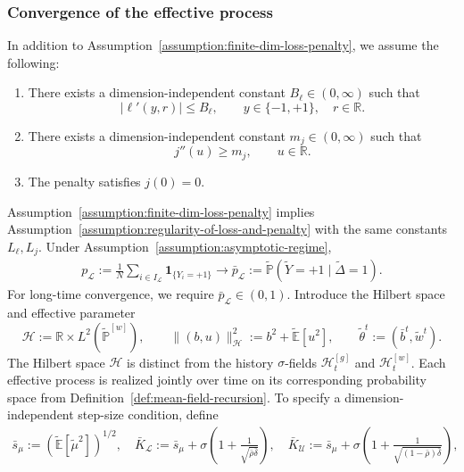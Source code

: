 \subsubsection{Convergence of the effective process}

\begin{assumption}
\label{assumption:long-time-loss-penalty}
In addition to
Assumption~\ref{assumption:finite-dim-loss-penalty},
we assume the following:
\begin{enumerate}
    \item There exists a dimension-independent constant
    $B_\ell\in(0,\infty)$ such that
    \[
        |\ell'(y,r)|\leq B_\ell,
        \qquad y\in\{-1,+1\},\quad r\in\mathbb R.
    \]

    \item There exists a dimension-independent constant
    $m_j\in(0,\infty)$ such that
    \[
        j''(u)\geq m_j,
        \qquad u\in\mathbb R.
    \]

    \item The penalty satisfies $j(0)=0$.
\end{enumerate}
\end{assumption}
Assumption~\ref{assumption:finite-dim-loss-penalty}
implies Assumption~\ref{assumption:regularity-of-loss-and-penalty}
with the same constants $L_\ell,L_j$.
Under Assumption~\ref{assumption:asymptotic-regime},
\begin{align}
    p_{\mathcal L}
    :=
    \frac1N\sum_{i\in I_{\mathcal L}}
        \mathbf1_{\{Y_i=+1\}}
    \longrightarrow
    \bar p_{\mathcal L}
    :=
    \tilde{\mathbb P}(\tilde Y = +1 \mid \tilde \Delta = 1).
    \label{eq:limiting-labeled-class-proportion}
\end{align}
For long-time convergence, we require
$\bar p_{\mathcal L}\in(0,1)$.
Introduce the Hilbert space and effective parameter
\[
    \mathcal H
    :=\mathbb R\times L^2(\tilde{\mathbb P}^{[w]}),
    \qquad
    \|(b,u)\|_{\mathcal H}^2
    :=b^2+\tilde{\mathbb E}[u^2],
    \qquad
    \tilde\theta^t:=(\bar b^t,\tilde w^t).
\]
The Hilbert space $\mathcal H$ is distinct from the history
$\sigma$-fields $\mathcal H_t^{[g]}$ and $\mathcal H_t^{[w]}$.
Each effective process is realized jointly over time on its
corresponding probability space from
Definition~\ref{def:mean-field-recursion}.
To specify a dimension-independent step-size condition, define
\begin{align}
    \bar s_\mu
    :=\left(\tilde{\mathbb E}[\tilde\mu^2]\right)^{1/2}
    , \quad
    \bar K_{\mathcal L}
    :=\bar s_\mu+
    \sigma\left(1+\frac1{\sqrt{\bar\rho\bar\delta}}\right)
    , \quad
    \bar K_{\mathcal U}
    :=\bar s_\mu+
    \sigma\left(
        1+\frac1{\sqrt{(1-\bar\rho)\bar\delta}}
    \right), \label{eq:s-mu-k-bar}
\end{align}
